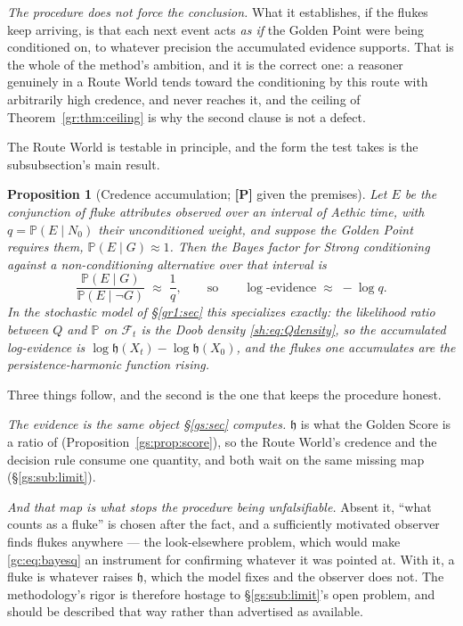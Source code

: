 \documentclass[11pt]{article}
\numberwithin{equation}{section}
\theoremstyle{plain}
\newtheorem{proposition}[theorem]{Proposition}
\theoremstyle{definition}
\theoremstyle{remark}
\newcommand{\PP}{\mathbb{P}}
\newcommand{\Fc}{\mathcal{F}}
\newcommand{\hm}{\mathfrak{h}}
\begin{document}
\emph{The procedure does not force the conclusion.} What it establishes,
if the flukes keep arriving, is that each next event acts \emph{as if}
the Golden Point were being conditioned on, to whatever precision the
accumulated evidence supports. That is the whole of the method's
ambition, and it is the correct one: a reasoner genuinely in a Route
World tends toward the conditioning by this route with arbitrarily high
credence, and never reaches it, and the ceiling of
Theorem~\ref{gr:thm:ceiling} is why the second clause is not a defect.

The Route World is testable in
principle, and the form the test takes is the subsubsection's main
result.

\begin{proposition}[Credence accumulation; \textbf{[P]} given the
premises]\label{gc:prop:credence}
Let $E$ be the conjunction of fluke attributes observed over an interval
of Aethic time, with $q=\PP(E\mid N_0)$ their unconditioned weight, and
suppose the Golden Point requires them, $\PP(E\mid G)\approx1$. Then the
Bayes factor for Strong conditioning against a non-conditioning
alternative over that interval is
\begin{equation}\label{gc:eq:bayesq}
\frac{\PP(E\mid G)}{\PP(E\mid \neg G)}\;\approx\;\frac1q,
\qquad\text{so}\qquad
\log\text{-evidence}\;\approx\;-\log q .
\end{equation}
In the stochastic model of \S\ref{gr1:sec} this specializes exactly:
the likelihood ratio between $Q$ and $\PP$ on $\Fc_t$ is the Doob
density \eqref{sh:eq:Qdensity}, so the accumulated log-evidence is
$\log\hm(X_t)-\log\hm(X_0)$, and \emph{the flukes one accumulates are
the persistence-harmonic function rising}.
\end{proposition}

Three things follow, and the second is the one that keeps the procedure
honest.

\emph{The evidence is the same object \S\ref{gs:sec} computes.} $\hm$ is
what the Golden Score is a ratio of (Proposition~\ref{gs:prop:score}),
so the Route World's credence and the decision rule consume one
quantity, and both wait on the same missing map
(\S\ref{gs:sub:limit}).

\emph{And that map is what stops the procedure being unfalsifiable.}
Absent it, ``what counts as a fluke'' is chosen after the fact, and a
sufficiently motivated observer finds flukes anywhere --- the
look-elsewhere problem, which would make \eqref{gc:eq:bayesq} an
instrument for confirming whatever it was pointed at. With it, a fluke
is whatever raises $\hm$, which the model fixes and the observer does
not. The methodology's rigor is therefore hostage to
\S\ref{gs:sub:limit}'s open problem, and should be described that way
rather than advertised as available.
\end{document}
